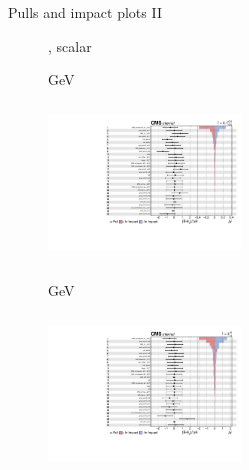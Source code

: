\documentclass[8pt]{beamer}
\begin{document}
\begin{frame}{Pulls and impact plots II}
\justifying
\begin{figure}[htbp]
\centering
\begin{block}{, scalar}\end{block}	\vspace{-8pt}

\begin{minipage}[b]{0.49\textwidth}
\begin{center}
\centering \begin{block}{ GeV}\end{block}	
\includegraphics[width=5.1cm, height=4.2cm]{figs/impacts_2017_both_scalar_100.pdf}
\end{center}
\end{minipage}\hfill
\begin{minipage}[b]{0.49\textwidth}
\begin{center}
\centering \begin{block}{ GeV}\end{block}	
\includegraphics[width=5.1cm, height=4.2cm]{figs/impacts_2017_both_scalar_500.pdf}
\end{center}
\end{minipage} \hfill
\end{figure}
\end{frame}
\end{document}
